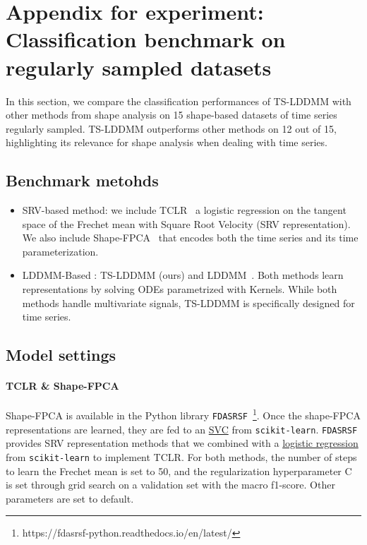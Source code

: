 \section{Appendix for experiment: Classification benchmark on regularly sampled datasets}

In this section, we compare the classification performances of TS-LDDMM with other methods from shape analysis on 15 shape-based datasets of time series regularly sampled. TS-LDDMM outperforms other methods on 12 out of 15, highlighting its relevance for shape analysis when dealing with time series. 


\subsection{Benchmark metohds}
\begin{itemize}
  \item SRV-based method: we include TCLR~\cite{heo2024logistic} a logistic regression on the tangent space of the Frechet mean with Square Root Velocity (SRV representation). We also include Shape-FPCA~\cite{wu2024shape} that encodes both the time series and its time parameterization. 
  \item LDDMM-Based : TS-LDDMM (ours) and LDDMM~\cite{glaunes2008large}. Both methods learn representations by solving ODEs parametrized with Kernels. While both methods handle multivariate signals, TS-LDDMM is specifically designed for time series.
 \end{itemize}

\subsection{Model settings}

\paragraph{TCLR \& Shape-FPCA}
Shape-FPCA is available in the Python library \texttt{FDASRSF}~\footnote{https://fdasrsf-python.readthedocs.io/en/latest/}. Once the shape-FPCA representations are learned, they are fed to an \href{https://scikit-learn.org/stable/modules/generated/sklearn.svm.SVC.html#sklearn.svm.SVC}{SVC} from \texttt{scikit-learn}. \texttt{FDASRSF} provides SRV representation methods that we combined with a \href{https://scikit-learn.org/stable/modules/generated/sklearn.linear_model.LogisticRegressionCV.html}{logistic regression} from \texttt{scikit-learn} to implement TCLR. For both methods, the number of steps to learn the Frechet mean is set to 50, and the regularization hyperparameter C is set through grid search on a validation set with the macro f1-score. Other parameters are set to default.  

